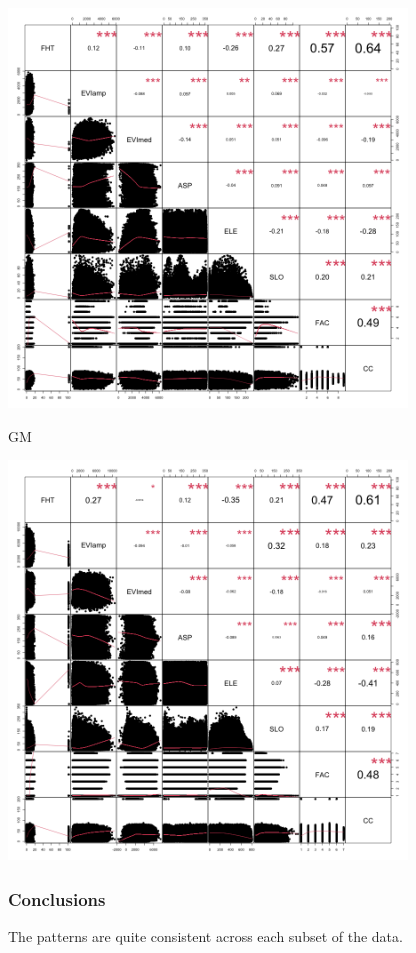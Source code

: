 \documentclass[
  letterpaper,
  DIV=11,
  numbers=noendperiod]{scrartcl}
\begin{document}
\includegraphics[width=4.16667in,height=\textheight]{correlation plots/chart_raster_TN.png}

GM

\includegraphics[width=4.16667in,height=\textheight]{correlation plots/chart_raster_GM.png}

\hypertarget{conclusions}{%
\subsubsection{Conclusions}\label{conclusions}}

The patterns are quite consistent across each subset of the data.
\end{document}
